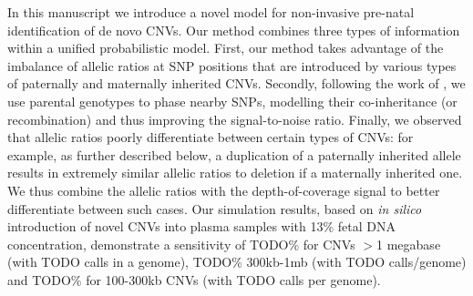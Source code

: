 In this manuscript we introduce a novel model for non-invasive pre-natal identification of de novo CNVs. Our method combines three types of information within a unified probabilistic model. First, our method takes advantage of the imbalance of allelic ratios at SNP positions that are introduced by various types of paternally and maternally inherited CNVs. Secondly, following the work of \cite{kitzman2012}, we use parental genotypes to phase nearby SNPs, modelling their co-inheritance (or recombination) and thus improving the signal-to-noise ratio. Finally, we observed that allelic ratios poorly differentiate between certain types of CNVs: for example, as further described below,  a duplication of a paternally inherited allele results in extremely similar allelic ratios to deletion if a maternally inherited one. We thus combine the allelic ratios with the depth-of-coverage signal to better differentiate between such cases. Our simulation results, based on \emph{in silico} introduction of novel CNVs into plasma samples with 13\% fetal DNA concentration, demonstrate a sensitivity of TODO\% for CNVs $>$1 megabase (with TODO calls in a genome), TODO\% 300kb-1mb (with TODO calls/genome) and TODO\% for 100-300kb CNVs (with TODO calls  per genome).


